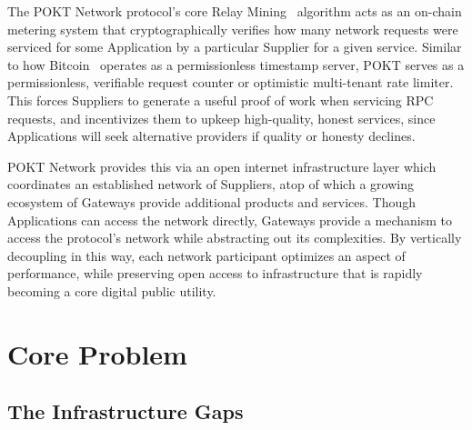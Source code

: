 \documentclass[conference,compsoc]{IEEEtran}
\begin{document}
The POKT Network protocol's core Relay Mining~\cite{olshansky2023relay} algorithm acts as an on-chain metering system that cryptographically verifies how many network requests were serviced for some Application by a particular Supplier for a given service. Similar to how Bitcoin~\cite{nakamoto2008bitcoin} operates as a permissionless timestamp server, POKT serves as a permissionless, verifiable request counter or optimistic multi-tenant rate limiter. This forces Suppliers to generate a useful proof of work when servicing RPC requests, and incentivizes them to upkeep high-quality, honest services, since Applications will seek alternative providers if quality or honesty declines.

POKT Network provides this via an open internet infrastructure layer which coordinates an established network of Suppliers, atop of which a growing ecosystem of Gateways provide additional products and services. Though Applications can access the network directly, Gateways provide a mechanism to access the protocol's network while abstracting out its complexities. By vertically decoupling in this way, each network participant optimizes an aspect of performance, while preserving open access to infrastructure that is rapidly becoming a core digital public utility.

\section{Core Problem}

\subsection{The Infrastructure Gaps}
\end{document}
